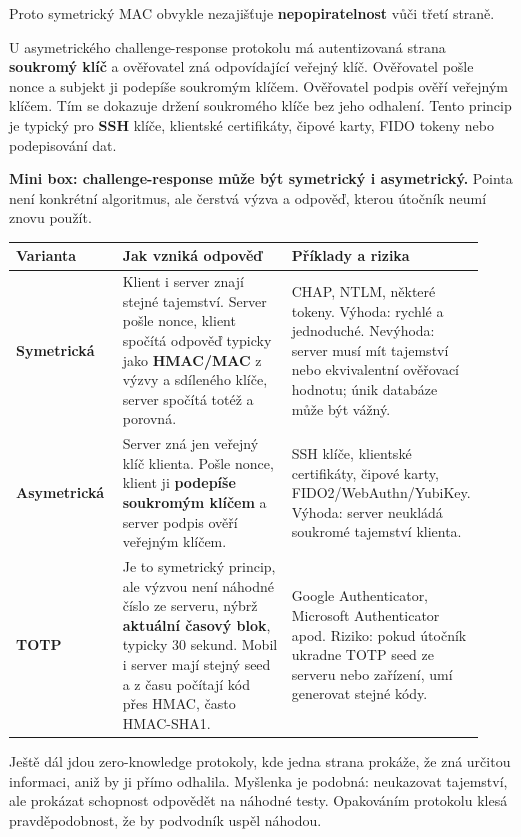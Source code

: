 \documentclass[11pt,a4paper]{article}
\newcommand{\itpr}[1]{\medskip\noindent\colorbox{green!8}{\parbox{\dimexpr\linewidth-2\fboxsep}{#1}}\medskip}
\begin{document}
Proto symetrický MAC obvykle nezajišťuje \textbf{nepopiratelnost} vůči třetí straně.

U asymetrického challenge-response protokolu má autentizovaná strana \textbf{soukromý klíč} a ověřovatel zná odpovídající veřejný klíč. Ověřovatel pošle nonce a subjekt ji podepíše soukromým klíčem. Ověřovatel podpis ověří veřejným klíčem. Tím se dokazuje držení soukromého klíče bez jeho odhalení. Tento princip je typický pro \textbf{SSH} klíče, klientské certifikáty, čipové karty, FIDO tokeny nebo podepisování dat.

\itpr{\textbf{Mini box: challenge-response může být symetrický i asymetrický.} Pointa není konkrétní algoritmus, ale čerstvá výzva a odpověď, kterou útočník neumí znovu použít.}

\begin{longtable}{p{0.23\linewidth}p{0.39\linewidth}p{0.31\linewidth}}
\toprule
\textbf{Varianta} & \textbf{Jak vzniká odpověď} & \textbf{Příklady a rizika} \\
\midrule\endhead
\textbf{Symetrická} & Klient i server znají stejné tajemství. Server pošle nonce, klient spočítá odpověď typicky jako \textbf{HMAC/MAC} z výzvy a sdíleného klíče, server spočítá totéž a porovná. & CHAP, NTLM, některé tokeny. Výhoda: rychlé a jednoduché. Nevýhoda: server musí mít tajemství nebo ekvivalentní ověřovací hodnotu; únik databáze může být vážný. \\
\addlinespace
\textbf{Asymetrická} & Server zná jen veřejný klíč klienta. Pošle nonce, klient ji \textbf{podepíše soukromým klíčem} a server podpis ověří veřejným klíčem. & SSH klíče, klientské certifikáty, čipové karty, FIDO2/WebAuthn/YubiKey. Výhoda: server neukládá soukromé tajemství klienta. \\
\addlinespace
\textbf{TOTP} & Je to symetrický princip, ale výzvou není náhodné číslo ze serveru, nýbrž \textbf{aktuální časový blok}, typicky 30 sekund. Mobil i server mají stejný seed a z času počítají kód přes HMAC, často HMAC-SHA1. & Google Authenticator, Microsoft Authenticator apod. Riziko: pokud útočník ukradne TOTP seed ze serveru nebo zařízení, umí generovat stejné kódy. \\
\bottomrule
\end{longtable}

Ještě dál jdou zero-knowledge protokoly, kde jedna strana prokáže, že zná určitou informaci, aniž by ji přímo odhalila. Myšlenka je podobná: neukazovat tajemství, ale prokázat schopnost odpovědět na náhodné testy. Opakováním protokolu klesá pravděpodobnost, že by podvodník uspěl náhodou.
\end{document}
